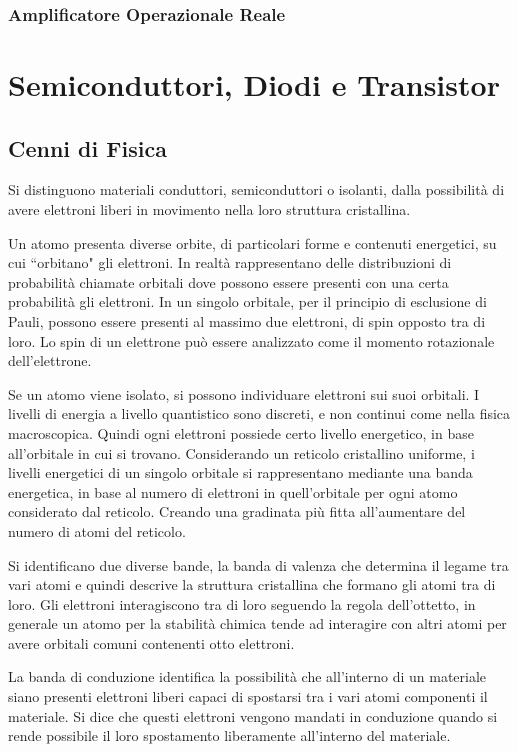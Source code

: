 \documentclass{article}
\numberwithin{equation}{subsection}
\begin{document}
\subsubsection{Amplificatore Operazionale Reale}

\clearpage

\section{Semiconduttori, Diodi e Transistor}

\subsection{Cenni di Fisica}

Si distinguono materiali conduttori, semiconduttori o isolanti, dalla possibilità di avere elettroni liberi in movimento nella loro struttura cristallina.  

Un atomo presenta diverse orbite, di particolari forme e contenuti energetici, su cui ``orbitano" gli elettroni. In realtà rappresentano delle distribuzioni di probabilità 
chiamate orbitali dove possono essere presenti con una certa probabilità gli elettroni. In un singolo orbitale, per il principio di esclusione di Pauli, possono essere 
presenti al massimo due elettroni, di spin opposto tra di loro. Lo spin di un elettrone può essere analizzato come il momento rotazionale dell'elettrone. 


Se un atomo viene isolato, si possono individuare elettroni sui suoi orbitali. I livelli di energia a livello quantistico sono discreti, e non continui 
come nella fisica macroscopica. Quindi ogni elettroni possiede certo livello energetico, in base all'orbitale in cui si trovano. Considerando un reticolo cristallino uniforme, 
i livelli energetici di un singolo orbitale si rappresentano mediante una banda energetica, in base al numero di elettroni in quell'orbitale per ogni atomo considerato 
dal reticolo. Creando una gradinata più fitta all'aumentare del numero di atomi del reticolo. 

Si identificano due diverse bande, la banda di valenza che determina il legame tra vari atomi e quindi descrive la struttura cristallina che formano gli atomi 
tra di loro. Gli elettroni interagiscono tra di loro seguendo la regola dell'ottetto, in generale un atomo per la stabilità chimica tende ad interagire con altri atomi per 
avere orbitali comuni contenenti otto elettroni. 

La banda di conduzione identifica la possibilità che all'interno di un materiale siano presenti elettroni liberi capaci di spostarsi tra i vari atomi componenti il 
materiale. Si dice che questi elettroni vengono mandati in conduzione quando si rende possibile il loro spostamento liberamente all'interno del materiale.  
\end{document}
